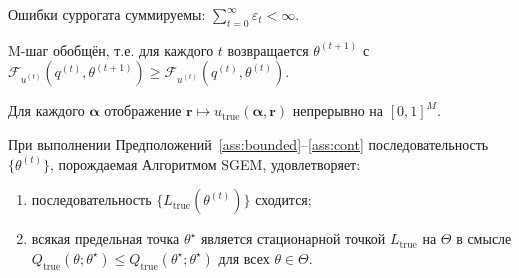 \begin{assumption}
\label{ass:summable}
Ошибки суррогата суммируемы:
$\sum_{t=0}^{\infty} \varepsilon_t < \infty$.
\end{assumption}

\begin{assumption}
\label{ass:gem}
M-шаг обобщён, т.е. для каждого $t$ возвращается $\theta^{(t+1)}$ с
$\mathcal{F}_{u^{(t)}}(q^{(t)}, \theta^{(t+1)})
\geq \mathcal{F}_{u^{(t)}}(q^{(t)}, \theta^{(t)})$.
\end{assumption}

\begin{assumption}
\label{ass:cont}
Для каждого $\boldsymbol{\alpha}$ отображение
$\mathbf{r}\mapsto u_{\mathrm{true}}(\boldsymbol{\alpha}, \mathbf{r})$
непрерывно на $[0,1]^M$.
\end{assumption}

\begin{theorem}
\label{thm:sgem}
При выполнении Предположений~\ref{ass:bounded}--\ref{ass:cont}
последовательность $\{\theta^{(t)}\}$, порождаемая Алгоритмом SGEM,
удовлетворяет:
\begin{enumerate}
\item[\textup{(a)}] последовательность
$\{L_{\mathrm{true}}(\theta^{(t)})\}$ сходится;
\item[\textup{(b)}] всякая предельная точка $\theta^{\star}$ является
стационарной точкой $L_{\mathrm{true}}$ на $\Theta$ в смысле
$Q_{\mathrm{true}}(\theta;\theta^{\star}) \leq
Q_{\mathrm{true}}(\theta^{\star};\theta^{\star})$ для всех
$\theta\in\Theta$.
\end{enumerate}
\end{theorem}

